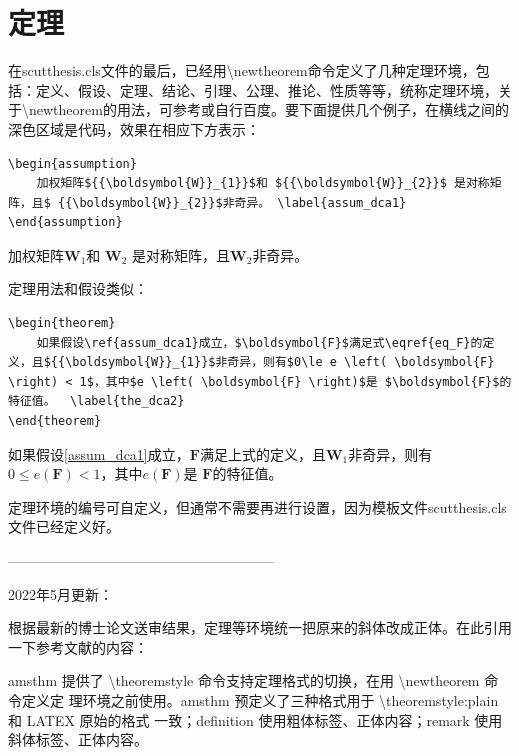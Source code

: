 \section{定理}
在scutthesis.cls文件的最后，已经用\textbackslash{}newtheorem命令定义了几种定理环境，包括：定义、假设、定理、结论、引理、公理、推论、性质等等，统称定理环境，关于\textbackslash{}newtheorem的用法，可参考\cite{_g,_c}或自行百度。要下面提供几个例子，在横线之间的深色区域是代码，效果在相应下方表示：
\begin{lstlisting}
\begin{assumption}
	加权矩阵${{\boldsymbol{W}}_{1}}$和 ${{\boldsymbol{W}}_{2}}$ 是对称矩阵，且$ {{\boldsymbol{W}}_{2}}$非奇异。	\label{assum_dca1}
\end{assumption}
\end{lstlisting}
\begin{assumption}
	加权矩阵${{\boldsymbol{W}}_{1}}$和 ${{\boldsymbol{W}}_{2}}$ 是对称矩阵，且$ {{\boldsymbol{W}}_{2}}$非奇异。	\label{assum_dca1}
\end{assumption}

定理用法和假设类似：
\begin{lstlisting}
\begin{theorem}
	如果假设\ref{assum_dca1}成立，$\boldsymbol{F}$满足式\eqref{eq_F}的定义，且${{\boldsymbol{W}}_{1}}$非奇异，则有$0\le e \left( \boldsymbol{F} \right) < 1$，其中$e \left( \boldsymbol{F} \right)$是 $\boldsymbol{F}$的特征值。	\label{the_dca2}
\end{theorem}
\end{lstlisting}
\begin{theorem}
	如果假设\ref{assum_dca1}成立，$\boldsymbol{F}$满足上式的定义，且${{\boldsymbol{W}}_{1}}$非奇异，则有$0\le e \left( \boldsymbol{F} \right) < 1$，其中$e \left( \boldsymbol{F} \right)$是 $\boldsymbol{F}$的特征值。	\label{the_dca2}
\end{theorem}
\begin{remark}
	定理环境的编号可自定义，但通常不需要再进行设置，因为模板文件scutthesis.cls文件已经定义好。
\end{remark}

---------------------------------------------------------

2022年5月更新：

根据最新的博士论文送审结果，定理等环境统一把原来的斜体改成正体。在此引用一下参考文献\cite{_g}的内容：

amsthm 提供了 \textbackslash{}theoremstyle 命令支持定理格式的切换，在用 \textbackslash{}newtheorem 命令定义定 理环境之前使用。amsthm 预定义了三种格式用于 \textbackslash{}theoremstyle:plain 和 LATEX 原始的格式 一致；definition 使用粗体标签、正体内容；remark 使用斜体标签、正体内容。

